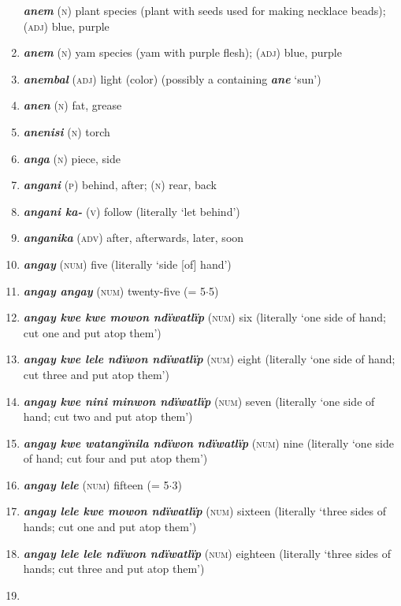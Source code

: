 \begin{enumerate}[noitemsep, label={}, align=left, widest=190, labelsep=1ex,leftmargin=*,itemindent=-10pt]
\textbf{\textit{anem}} (\textsc{n}) plant species (plant with seeds used for making necklace beads); \linebreak (\textsc{adj}) blue, purple \item 
\textbf{\textit{anem}} (\textsc{n}) yam species (yam with purple flesh); (\textsc{adj}) blue, purple \item 
\textbf{\textit{anembal}} (\textsc{adj}) light (color) (possibly a  containing \textbf{\textit{ane}} ‘sun’) \item 
\textbf{\textit{anen}} (\textsc{n}) fat, grease \item 
\textbf{\textit{anenisi}} (\textsc{n}) torch \item 
\textbf{\textit{anga}} (\textsc{n}) piece, side \item 
\textbf{\textit{angani}} (\textsc{p}) behind, after; (\textsc{n}) rear, back \item 
\textbf{\textit{angani ka-}} (\textsc{v}) follow (literally ‘let behind’) \item 
\textbf{\textit{anganika}} (\textsc{adv}) after, afterwards, later, soon \item 
\textbf{\textit{angay}} (\textsc{num}) five (literally ‘side [of] hand’) \item 
\textbf{\textit{angay angay}} (\textsc{num}) twenty-five (= 5${\cdot}$5) \item 
\textbf{\textit{angay kwe kwe mowon ndïwatlïp}} (\textsc{num}) six (literally ‘one side of hand; cut one and put atop them’) \item 
\textbf{\textit{angay kwe lele ndïwon ndïwatlïp}} (\textsc{num}) eight (literally ‘one side of hand; cut three and put atop them’) \item 
\textbf{\textit{angay kwe nini minwon ndïwatlïp}} (\textsc{num}) seven (literally ‘one side of hand; cut two and put atop them’) \item 
\textbf{\textit{angay kwe watangïnila ndïwon ndïwatlïp}} (\textsc{num}) nine (literally ‘one side of hand; cut four and put atop them’) \item 
\textbf{\textit{angay lele}} (\textsc{num}) fifteen (= 5${\cdot}$3) \item 
\textbf{\textit{angay lele kwe mowon ndïwatlïp}} (\textsc{num}) sixteen (literally ‘three sides of hands; cut one and put atop them’) \item 
\textbf{\textit{angay lele lele ndïwon ndïwatlïp}} (\textsc{num}) eighteen (literally ‘three sides of hands; cut three and put atop them’) \item 

\end{enumerate}
